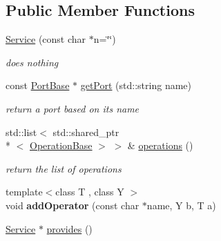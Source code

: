\subsection*{Public Member Functions}
\begin{DoxyCompactItemize}
\item 
\hypertarget{classcoco_1_1_service_a6b53a91756ceca64bacd1e3137fb4d5c}{\hyperlink{classcoco_1_1_service_a6b53a91756ceca64bacd1e3137fb4d5c}{Service} (const char $\ast$n=\char`\"{}\char`\"{})}\label{classcoco_1_1_service_a6b53a91756ceca64bacd1e3137fb4d5c}

\begin{DoxyCompactList}\small\item\em does nothing \end{DoxyCompactList}\item 
\hypertarget{classcoco_1_1_service_aed09c13ca5ba4b5286ccb29ec8c4ab64}{const \hyperlink{classcoco_1_1_port_base}{Port\-Base} $\ast$ \hyperlink{classcoco_1_1_service_aed09c13ca5ba4b5286ccb29ec8c4ab64}{get\-Port} (std\-::string name)}\label{classcoco_1_1_service_aed09c13ca5ba4b5286ccb29ec8c4ab64}

\begin{DoxyCompactList}\small\item\em return a port based on its name \end{DoxyCompactList}\item 
\hypertarget{classcoco_1_1_service_a4362d7b5f4d83d1671e44e7a4e5f16b1}{std\-::list$<$ std\-::shared\-\_\-ptr\\*
$<$ \hyperlink{classcoco_1_1_operation_base}{Operation\-Base} $>$ $>$ \& \hyperlink{classcoco_1_1_service_a4362d7b5f4d83d1671e44e7a4e5f16b1}{operations} ()}\label{classcoco_1_1_service_a4362d7b5f4d83d1671e44e7a4e5f16b1}

\begin{DoxyCompactList}\small\item\em return the list of operations \end{DoxyCompactList}\item 
\hypertarget{classcoco_1_1_service_acf356eb32bb5d492eb5fb767531064a5}{{\footnotesize template$<$class T , class Y $>$ }\\void {\bfseries add\-Operator} (const char $\ast$name, Y b, T a)}\label{classcoco_1_1_service_acf356eb32bb5d492eb5fb767531064a5}

\item 
\hypertarget{classcoco_1_1_service_ad73c4cdd616d7308174c9b40bf69489c}{\hyperlink{classcoco_1_1_service}{Service} $\ast$ \hyperlink{classcoco_1_1_service_ad73c4cdd616d7308174c9b40bf69489c}{provides} ()}\label{classcoco_1_1_service_ad73c4cdd616d7308174c9b40bf69489c}


\end{DoxyCompactItemize}
